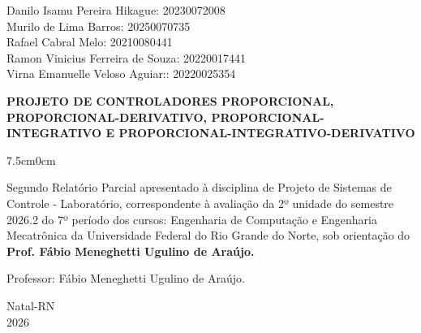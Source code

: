 \documentclass[a4paper,12pt]{article}
\begin{document}
\newpage


\thispagestyle{empty}

\begin{center}
\begin{normalsize}
Danilo Isamu Pereira Hikague: 20230072008\\
\vspace{0.8cm}
Murilo de Lima Barros: 20250070735\\
\vspace{0.8cm}
Rafael Cabral Melo: 20210080441\\
\vspace{0.8cm}
Ramon Vinicius Ferreira de Souza: 20220017441\\
\vspace{0.8cm}
Virna Emanuelle Veloso Aguiar:: 20220025354\\

\end{normalsize}
\end{center}
\vspace{3cm}

{\bf{\large {\centering PROJETO DE CONTROLADORES PROPORCIONAL, PROPORCIONAL-DERIVATIVO, PROPORCIONAL-INTEGRATIVO E PROPORCIONAL-INTEGRATIVO-DERIVATIVO\\
}}}

\vspace{4cm}

\begin{adjustwidth}{7.5cm}{0cm}

{\normalsize

Segundo Relatório Parcial apresentado à disciplina de
Projeto de Sistemas de Controle - Laboratório, correspondente à
avaliação da 2º unidade do semestre 2026.2 do 7º período
dos cursos: Engenharia de Computação e Engenharia Mecatrônica da
Universidade Federal do Rio Grande do Norte, sob
orientação do {\bf Prof. Fábio Meneghetti Ugulino de
Araújo.}

}

\end{adjustwidth}

\vspace{2cm}

\begin{center}

Professor:  Fábio Meneghetti Ugulino de Araújo.

\vspace{2.5cm}

{\large Natal-RN\\
2026}

\end{center}
\end{document}
